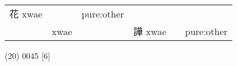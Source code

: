 \documentclass[14pt,a4paper]{scrartcl}
\begin{document}
\begin{longtable}[c]{@{}llllll@{}}
\begin{minipage}[t]{0.14\columnwidth}
花 xwae
\strut\end{minipage} &
\begin{minipage}[t]{0.14\columnwidth}\raggedright\strut
\strut\end{minipage} &
\begin{minipage}[t]{0.14\columnwidth}\raggedright\strut
pure:other
\strut\end{minipage}\tabularnewline
\begin{minipage}[t]{0.14\columnwidth}\raggedright\strut
𦾓
\strut\end{minipage} &
\begin{minipage}[t]{0.14\columnwidth}\raggedright\strut
xwae
\strut\end{minipage} &
\begin{minipage}[t]{0.14\columnwidth}\raggedright\strut
\strut\end{minipage} &
\begin{minipage}[t]{0.14\columnwidth}\raggedright\strut
譁 xwae
\strut\end{minipage} &
\begin{minipage}[t]{0.14\columnwidth}\raggedright\strut
\strut\end{minipage} &
\begin{minipage}[t]{0.14\columnwidth}\raggedright\strut
pure:other
\strut\end{minipage}\tabularnewline
\bottomrule
\end{longtable}

(20) 0045 {[}6{]}
\end{document}
